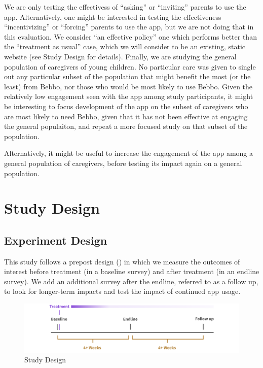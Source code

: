 \documentclass{article}
\begin{document}
We are only testing the effectivess of ``asking'' or ``inviting'' parents to use the app. Alternatively, one might be interested in testing the effectiveness ``incentivizing'' or ``forcing'' parents to use the app, but we are not doing that in this evaluation. We consider ``an effective policy'' one which performs better than the ``treatment as usual'' case, which we will consider to be an existing, static website (see Study Design for details). Finally, we are studying the general population of caregivers of young children. No particular care was given to single out any particular subset of the population that might benefit the most (or the least) from Bebbo, nor those who would be most likely to use Bebbo. Given the relatively low engagement seen with the app among study participants, it might be interesting to focus development of the app on the subset of caregivers who are most likely to need Bebbo, given that it has not been effective at engaging the general populaiton, and repeat a more focused study on that subset of the population.

Alternatively, it might be useful to increase the engagement of the app among a general population of caregivers, before testing its impact again on a general population.


\section{Study Design}

\subsection*{Experiment Design}

This study follows a prepost design (\cite{Clifford2021}) in which we measure the outcomes of interest before treatment (in a baseline survey) and after treatment (in an endline survey). We add an additional survey after the endline, referred to as a follow up, to look for longer-term impacts and test the impact of continued app usage.


\begin{figure}[H]
\includegraphics[width=\textwidth]{images/design-timeline.png}
\caption{Study Design}
\label{fig:Study Design}
\end{figure}
\end{document}
